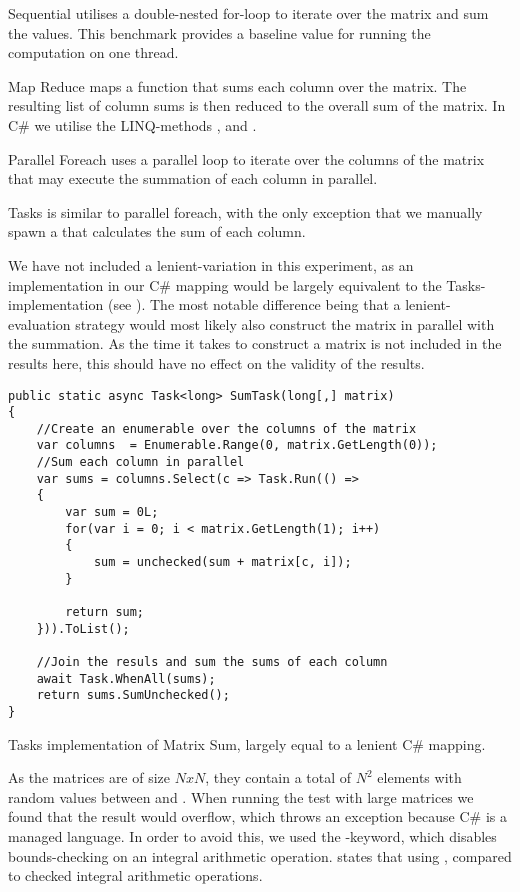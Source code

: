 \begin{labeling}{\quad\quad}
    \item[Sequential] utilises a double-nested for-loop to iterate over the matrix and sum the values. This benchmark provides a baseline value for running the computation on one thread.
    \item[Map Reduce] maps a function that sums each column over the matrix. The resulting list of column sums is then reduced to the overall sum of the matrix. In C\# we utilise the \gls{LINQ}-methods ,  and .
    \item[Parallel Foreach] uses a parallel loop to iterate over the columns of the matrix that may execute the summation of each column in parallel.
    \item[Tasks] is similar to parallel foreach, with the only exception that we manually spawn a  that calculates the sum of each column.
\end{labeling}

We have not included a lenient-variation in this experiment, as an implementation in our C\# mapping would be largely equivalent to the Tasks-implementation (see ). The most notable difference being that a lenient-evaluation strategy would most likely also construct the matrix in parallel with the summation. As the time it takes to construct a matrix is not included in the results here, this should have no effect on the validity of the results.
\begin{listing}
\begin{verbatim}
public static async Task<long> SumTask(long[,] matrix)
{
    //Create an enumerable over the columns of the matrix
    var columns  = Enumerable.Range(0, matrix.GetLength(0));
    //Sum each column in parallel
    var sums = columns.Select(c => Task.Run(() =>
    {
        var sum = 0L;
        for(var i = 0; i < matrix.GetLength(1); i++)
        {
            sum = unchecked(sum + matrix[c, i]);
        }

        return sum;
    })).ToList();

    //Join the resuls and sum the sums of each column
    await Task.WhenAll(sums);
    return sums.SumUnchecked();
}
\end{verbatim}
\caption{Tasks implementation of Matrix Sum, largely equal to a lenient C\# mapping.} \label{lst:matrix-sum-csharp}
\end{listing}

As the matrices are of size $N x N$, they contain a total of $N^2$ elements with random values between  and . When running the test with large matrices we found that the result would overflow, which throws an exception because C\# is a managed language. In order to avoid this, we used the -keyword, which disables bounds-checking on an integral arithmetic operation\cite{csharp:unchecked}. \cite{csharp:unchecked} states that using  \textit{}, compared to checked integral arithmetic operations.

